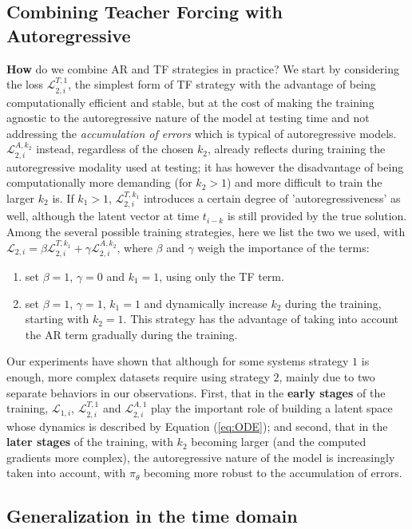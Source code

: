 \subsection{Combining Teacher Forcing with Autoregressive}
\label{subsec:TF_&_AR}
\textbf{How} do we combine AR and TF strategies in practice? We start by considering the loss $\mathcal{L}^{T,1}_{2,i}$, the simplest form of TF strategy with the advantage of being computationally efficient and stable, but at the cost of making the training agnostic to the autoregressive nature of the model at testing time and not addressing the \textit{accumulation of errors} which is typical of autoregressive models. $\mathcal{L}^{A,k_2}_{2,i}$ instead, regardless of the chosen $k_2$, already reflects during training the autoregressive modality used at testing; it has however the disadvantage of being computationally more demanding (for $k_2>1$) and more difficult to train the larger $k_2$ is. If $k_1>1$, $\mathcal{L}^{T,k_1}_{2,i}$ introduces a certain degree of 'autoregressiveness' as well, although the latent vector at time $t_{i-k}$ is still provided by the true solution. Among the several possible training strategies, here we list the two we used, with $\mathcal{L}_{2,i}=\beta \mathcal{L}^{T,k_1}_{2,i}+\gamma \mathcal{L}^{A,k_2}_{2,i}$, where $\beta$ and $\gamma$ weigh the importance of the terms:
\begin{enumerate}
    \item set $\beta=1$, $\gamma=0$ and $k_1=1$, using only the TF term.
    \item set $\beta=1$, $\gamma=1$, $k_1=1$ and dynamically increase $k_2$ during the training, starting with $k_2 = 1$. This strategy has the advantage of taking into account the AR term gradually during the training.
\end{enumerate}
Our experiments have shown that although for some systems strategy $1$ is enough, more complex datasets require using strategy $2$, mainly due to two separate behaviors in our observations. First, that in the \textbf{early stages} of the training, $\mathcal{L}_{1,i}$, $\mathcal{L}^{T,1}_{2,i}$ and $\mathcal{L}^{A,1}_{2,i}$ play the important role of building a latent space whose dynamics is described by Equation (\ref{eq:ODE}); and second, that in the \textbf{later stages} of the training, with $k_2$ becoming larger (and the computed gradients more complex), the autoregressive nature of the model is increasingly taken into account, with $\pi_\theta$ becoming more robust to the accumulation of errors.
\subsection{Generalization in the time domain}
\label{subsec:generalization_in_time}

